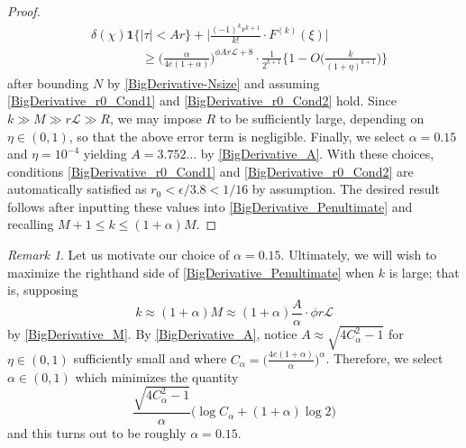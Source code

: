 \documentclass[12pt,psamsfonts]{amsart}
\theoremstyle{definition}
\theoremstyle{remark}
\numberwithin{equation}{section}
\theoremstyle{plain}
\theoremstyle{remark}
\newtheorem*{rem*}{Remark}
\renewcommand{\1}{ {\bf 1}}
\newcommand{\cL}{\mathcal{L}}
\begin{document}
\begin{proof}
\begin{equation}
\begin{aligned}
& \delta(\chi) \mathbf{1}\{ |\tau| < Ar \}  + \Big| \frac{(-1)^k r^{k+1}}{k!} \cdot  F^{(k)}(\xi)  \Big|  \\
& \qquad\qquad \geq \Big( \frac{\alpha}{4e(1+\alpha)} \Big)^{\phi Ar \cL + 8} \cdot  \frac{1}{2^{k+1}} \Big\{ 1 -  O\Big( \frac{k}{(1+\eta)^{k+1}} \Big) \Big\}   
\end{aligned}
 \label{BigDerivative_Penultimate}
\end{equation}
after bounding $N$ by \eqref{BigDerivative-Nsize} and assuming \eqref{BigDerivative_r0_Cond1} and \eqref{BigDerivative_r0_Cond2} hold.  Since $k \gg M \gg r\cL \gg R$, we may impose $R$ to be sufficiently large, depending on $\eta \in (0,1)$, so that the above error term is negligible. Finally, we select $\alpha = 0.15$ and $\eta = 10^{-4}$ yielding $A = 3.752\dots$ by \eqref{BigDerivative_A}. With these choices,  conditions \eqref{BigDerivative_r0_Cond1} and \eqref{BigDerivative_r0_Cond2} are automatically satisfied as $r_0 < \epsilon/3.8 < 1/16$ by assumption.  The desired result follows after inputting these values into \eqref{BigDerivative_Penultimate} and recalling $M+1 \leq k \leq (1+\alpha)M$.  
\end{proof}
\begin{rem*} Let us motivate our choice of $\alpha = 0.15$. Ultimately, we will wish to maximize the righthand side of \eqref{BigDerivative_Penultimate} when $k$ is large; that is, supposing 
\[
k \approx (1+\alpha)M \approx(1+\alpha) \frac{A}{\alpha}  \cdot  \phi r \cL
\]
by \eqref{BigDerivative_M}. By \eqref{BigDerivative_A}, notice $A \approx \sqrt{4C_{\alpha}^2-1}$ for $\eta \in (0,1)$ sufficiently small and where $C_{\alpha} = \big( \frac{4e(1+\alpha)}{\alpha} \big)^{\alpha}$. Therefore, we select $\alpha \in (0,1)$ which minimizes the quantity 
\[
\frac{ \sqrt{4C_{\alpha}^2-1}}{\alpha} \Big( \log C_{\alpha} +(1+\alpha)  \log 2 \Big)
\]
and this turns out to be roughly $\alpha = 0.15$. 
\end{rem*}

\end{document}
